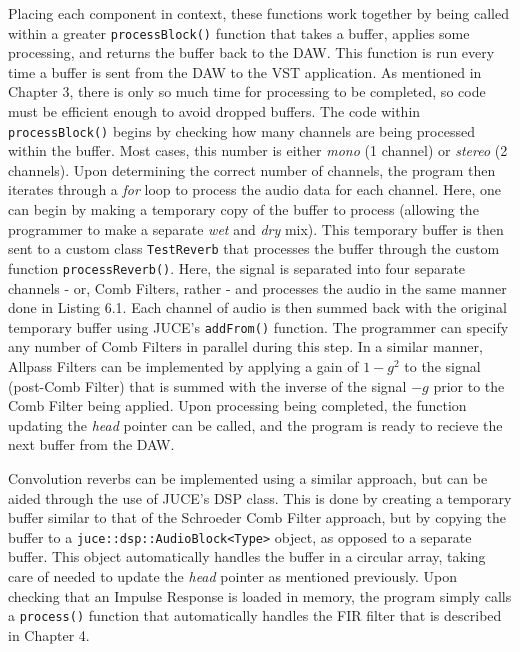 \begin{singlespace}

\end{singlespace} \hfill \break
\hspace*{0.6cm}Placing each component in context, these functions work together by being called within a greater \verb|processBlock()| function that takes a buffer, applies some processing, and returns the buffer back to the DAW. This function is run every time a buffer is sent from the DAW to the VST application. As mentioned in Chapter 3, there is only so much time for processing to be completed, so code must be efficient enough to avoid dropped buffers. The code within \verb|processBlock()| begins by checking how many channels are being processed within the buffer. Most cases, this number is either \textit{mono} (1 channel) or \textit{stereo} (2 channels). Upon determining the correct number of channels, the program then iterates through a \textit{for} loop to process the audio data for each channel. Here, one can begin by making a temporary copy of the buffer to process (allowing the programmer to make a separate \textit{wet} and \textit{dry} mix). This temporary buffer is then sent to a custom class \verb|TestReverb| that processes the buffer through the custom function \verb|processReverb()|. Here, the signal is separated into four separate channels - or, Comb Filters, rather - and processes the audio in the same manner done in Listing 6.1. Each channel of audio is then summed back with the original temporary buffer using JUCE's \verb|addFrom()| function. The programmer can specify any number of Comb Filters in parallel during this step. In a similar manner, Allpass Filters can be implemented by applying a gain of $1 - g^2$ to the signal (post-Comb Filter) that is summed with the inverse of the signal $-g$ prior to the Comb Filter being applied. Upon processing being completed, the function updating the \textit{head} pointer can be called, and the program is ready to recieve the next buffer from the DAW.

Convolution reverbs can be implemented using a similar approach, but can be aided through the use of JUCE's DSP class. This is done by creating a temporary buffer similar to that of the Schroeder Comb Filter approach, but by copying the buffer to a \verb|juce::dsp::AudioBlock<Type>| object, as opposed to a separate buffer. This object automatically handles the buffer in a circular array, taking care of needed to update the \textit{head} pointer as mentioned previously. Upon checking that an Impulse Response is loaded in memory, the program simply calls a \verb|process()| function that automatically handles the FIR filter that is described in Chapter 4.

